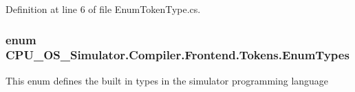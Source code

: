 Definition at line 6 of file Enum\+Token\+Type.\+cs.

\hypertarget{namespace_c_p_u___o_s___simulator_1_1_compiler_1_1_frontend_1_1_tokens_a7c0cc43763cc9d01c7d5af34d70b96ea}{}
\subsubsection[{Enum\+Types}]{\setlength{\rightskip}{0pt plus 5cm}enum {\bf C\+P\+U\+\_\+\+O\+S\+\_\+\+Simulator.\+Compiler.\+Frontend.\+Tokens.\+Enum\+Types}\hspace{0.3cm}{\ttfamily [strong]}}\label{namespace_c_p_u___o_s___simulator_1_1_compiler_1_1_frontend_1_1_tokens_a7c0cc43763cc9d01c7d5af34d70b96ea}


This enum defines the built in types in the simulator programming language 

